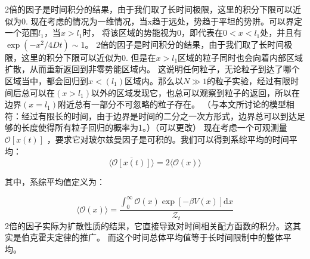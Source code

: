 2倍的因子是时间积分的结果，由于我们取了长时间极限，这里的积分下限可以近似为0.
现在考虑的情况为一维情况，当x趋于远处，势趋于平坦的势阱。可以界定一个范围$l_{1}$，当$x>l_{1}$时，
将该区域的势能视为0，即代表在$0<x<l_{1}$处，并且有$\exp \left(-x^{2} / 4 D t\right) \sim 1$。
2倍的因子是时间积分的结果，由于我们取了长时间极限，这里的积分下限可以近似为0.
但是在$x>l_{1}$区域的粒子同时也会向着内部区域扩散，从而重新返回到非零势能区域内。
这说明任何粒子，无论粒子到达了哪个区域当中，都会回归到$x<(l_{1})$区域内。那么以$N\gg1$的粒子实验，经过有限时间后总可以在$(x>l_{1})$以外的区域发现它，也总可以观察到粒子的返回，所以在边界$(x=l_{1})$附近总有一部分不可忽略的粒子存在。
（与本文所讨论的模型相符：经过有限长的时间，由于边界是时间的二分之一次方形式，边界总可以到达足够的长度使得所有粒子回归的概率为1。）（可以更改）
现在考虑一个可观测量  $\mathcal{O}[x(t)]$  ，要求它对玻尔兹曼因子是可积的。我们可以得到系综平均的时间平均：
\begin{equation}
\langle\overline{\mathcal{O}[x(t)]}\rangle=2\langle\mathcal{O}(x)\rangle
\end{equation}

其中，系综平均值定义为：

\begin{equation}
\langle\mathcal{O}(x)\rangle=\frac{\int_{0}^{\infty} \mathcal{O}(x) \exp [-\beta V(x)] \mathrm{d} x}{\mathcal{Z}_{t}}
\end{equation}
2倍的因子实际为扩散性质的结果，它直接导致对时间相关配方函数的积分。这其实是伯克霍夫定律的推广。
而这个时间总体平均值等于长时间限制中的整体平均。

